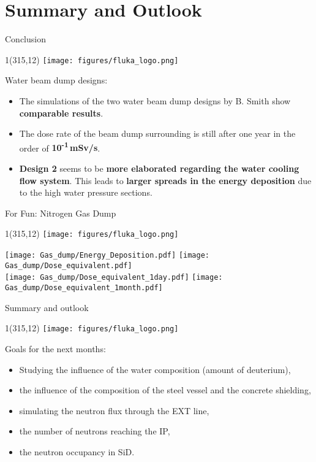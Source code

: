\documentclass[xcolor={dvipsnames}]{beamer}
\newcommand{\flukalogo}{
  \setlength{\TPHorizModule}{1pt}
  \setlength{\TPVertModule}{1pt}
  \begin{textblock}{1}(315,12)
   \texttt{[image: figures/fluka\_logo.png]}
  \end{textblock}
}
\begin{document}
\section{Summary and Outlook}
\begin{frame}{Conclusion}
 \flukalogo
 Water beam dump designs:
 \begin{itemize}
  \item The simulations of the two water beam dump designs by B. Smith show \textbf{comparable results}.
  \item The dose rate of the beam dump surrounding is still after one year in the order of \textbf{10\textsuperscript{-1}\,mSv/s}.
  \item \textbf{Design 2} seems to be \textbf{more elaborated regarding the water cooling flow system}.
  This leads to \textbf{larger spreads in the energy deposition} due to the high water pressure sections.
 \end{itemize}
\end{frame}
\begin{frame}{For Fun: Nitrogen Gas Dump}
 \flukalogo
 \texttt{[image: Gas\_dump/Energy\_Deposition.pdf]}\hfill
 \texttt{[image: Gas\_dump/Dose\_equivalent.pdf]}\\
 \texttt{[image: Gas\_dump/Dose\_equivalent\_1day.pdf]}\hfill
 \texttt{[image: Gas\_dump/Dose\_equivalent\_1month.pdf]}
\end{frame}

\begin{frame}{Summary and outlook}
 \flukalogo
 Goals for the next months:
\begin{itemize}
 \item Studying the influence of the water composition (amount of deuterium),
 \item the influence of the composition of the steel vessel and the concrete shielding,
 \item simulating the neutron flux through the EXT line,
 \item the number of neutrons reaching the IP,
 \item the neutron occupancy in SiD.
\end{itemize}
\end{frame}
\end{document}
